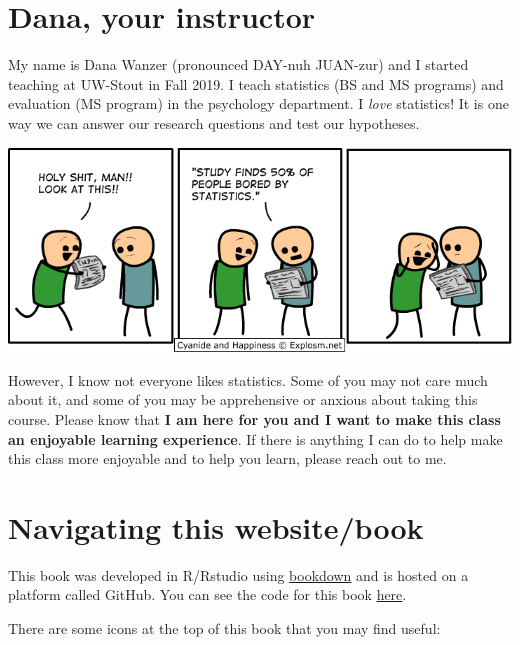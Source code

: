 \documentclass[
]{book}
\begin{document}
\hypertarget{dana-your-instructor}{%
\section{Dana, your instructor}\label{dana-your-instructor}}

My name is Dana Wanzer (pronounced DAY-nuh JUAN-zur) and I started teaching at UW-Stout in Fall 2019. I teach statistics (BS and MS programs) and evaluation (MS program) in the psychology department. I \emph{love} statistics! It is one way we can answer our research questions and test our hypotheses.

\includegraphics{images/01-intro/cyanide-happiness_statistics.png}

However, I know not everyone likes statistics. Some of you may not care much about it, and some of you may be apprehensive or anxious about taking this course. Please know that \textbf{I am here for you and I want to make this class an enjoyable learning experience}. If there is anything I can do to help make this class more enjoyable and to help you learn, please reach out to me.

\hypertarget{navigating-this-websitebook}{%
\section{Navigating this website/book}\label{navigating-this-websitebook}}

This book was developed in R/Rstudio using \href{https://bookdown.org/yihui/bookdown}{bookdown} and is hosted on a platform called GitHub. You can see the code for this book \href{https://github.com/danawanzer/stats-with-jamovi}{here}.

There are some icons at the top of this book that you may find useful:
\end{document}
